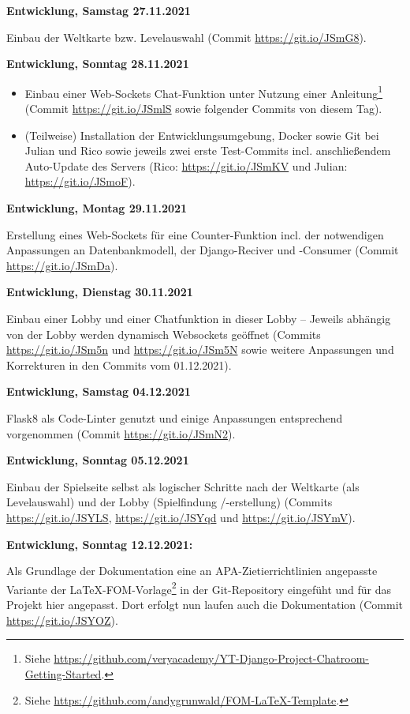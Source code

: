 \textbf{Entwicklung, Samstag 27.11.2021}

Einbau der Weltkarte bzw. Levelauswahl (Commit \url{https://git.io/JSmG8}).



\textbf{Entwicklung, Sonntag 28.11.2021}

\begin{itemize}
    \item Einbau einer Web-Sockets Chat-Funktion unter Nutzung einer Anleitung\footnote{Siehe \url{https://github.com/veryacademy/YT-Django-Project-Chatroom-Getting-Started}. } (Commit \url{https://git.io/JSmlS} sowie folgender Commits von diesem Tag).
    \item (Teilweise) Installation der Entwicklungsumgebung, Docker sowie Git bei Julian und Rico sowie jeweils zwei erste Test-Commits incl. anschließendem Auto-Update des Servers (Rico: \url{https://git.io/JSmKV} und Julian: \url{https://git.io/JSmoF}).
\end{itemize}



\textbf{Entwicklung, Montag 29.11.2021}

Erstellung eines Web-Sockets für eine Counter-Funktion incl. der notwendigen Anpassungen an Datenbankmodell, der Django-Reciver und -Consumer (Commit \url{https://git.io/JSmDa}).



\textbf{Entwicklung, Dienstag 30.11.2021}

Einbau einer Lobby und einer Chatfunktion in dieser Lobby -- Jeweils abhängig von der Lobby werden dynamisch Websockets geöffnet (Commits \url{https://git.io/JSm5n} und \url{https://git.io/JSm5N} sowie weitere Anpassungen und Korrekturen in den Commits vom 01.12.2021).


\textbf{Entwicklung, Samstag 04.12.2021}

Flask8 als Code-Linter genutzt und einige Anpassungen entsprechend vorgenommen (Commit \url{https://git.io/JSmN2}).


\textbf{Entwicklung, Sonntag 05.12.2021}

Einbau der Spielseite selbst als logischer Schritte nach der Weltkarte (als Levelauswahl) und der Lobby (Spielfindung /-erstellung) (Commits \url{https://git.io/JSYLS}, \url{https://git.io/JSYqd} und \url{https://git.io/JSYmV}).



\textbf{Entwicklung, Sonntag 12.12.2021:}

Als Grundlage der Dokumentation eine an APA-Zietierrichtlinien angepasste Variante der LaTeX-FOM-Vorlage\footnote{Siehe \url{https://github.com/andygrunwald/FOM-LaTeX-Template}.} in der Git-Repository eingefüht und für das Projekt hier angepasst. Dort erfolgt nun laufen auch die Dokumentation (Commit \url{https://git.io/JSYOZ}). 



